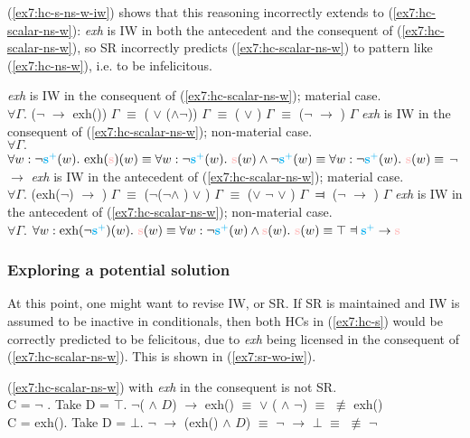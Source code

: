 (\ref{ex7:hc-s-ns-w-iw}) shows that this reasoning incorrectly extends to (\ref{ex7:hc-scalar-ns-w}): \textit{exh} is IW in both the antecedent and the consequent of (\ref{ex7:hc-scalar-ns-w}), so SR incorrectly predicts (\ref{ex7:hc-scalar-ns-w}) to pattern like (\ref{ex7:hc-ns-w}), i.e. to be infelicitous.

\begin{exe}
	\ex\label{ex7:hc-s-ns-w-iw}
	\begin{xlist}
		\ex\textit{exh} is IW in the consequent of (\ref{ex7:hc-scalar-ns-w}); material case.\\ $\forall \Gamma.$ ($\neg$\splus{} $\rightarrow$ exh(\s)) $\Gamma$ $\equiv$ (\splus{} $\vee$ (\s$\wedge$$\neg$\splus)) $\Gamma$ $\equiv$ (\splus{} $\vee$ \s) $\Gamma$ $\equiv$ ($\neg$\splus{} $\rightarrow$ \s) $\Gamma$
		\ex\textit{exh} is IW in the consequent of (\ref{ex7:hc-scalar-ns-w}); non-material case.\\ $\forall \Gamma.$ $\forall w: \neg\splus(w). \ \text{exh}(\s)(w) \equiv \forall w: \neg\splus(w). \ \s(w) \wedge \neg \splus(w) \equiv \forall w: \neg\splus(w). \ \s(w) \equiv$ $\neg$\splus $\rightarrow$ \s
		\ex\textit{exh} is IW in the antecedent of (\ref{ex7:hc-scalar-ns-w}); material case.\\
		$\forall \Gamma.$ (exh($\neg$\splus) $\rightarrow$ \s{}) $\Gamma$ $\equiv$ ($\neg$($\neg$\splus $\wedge$ \s) $\vee$ \s{}) $\Gamma$ $\equiv$ (\splus $\vee$ $\neg$\s{} $\vee$ \s) $\Gamma$ $\Dashv$ ($\neg$\splus{} $\rightarrow$ \s) $\Gamma$
		\ex\textit{exh} is IW in the antecedent of (\ref{ex7:hc-scalar-ns-w}); non-material case.\\$\forall \Gamma.$ $\forall w: \text{exh}(\neg\splus)(w). \ \s(w) \equiv \forall w: \neg\splus(w) \wedge \s(w). \ \s(w) \equiv \top \Dashv \splus \rightarrow \s$
	\end{xlist}
\end{exe}

\subsubsection{Exploring a potential solution}\label{sec:sr-iw-tentative-solution}
At this point, one might want to revise IW, or SR. If SR is maintained and IW is assumed to be inactive in conditionals, then both HCs in (\ref{ex7:hc-s}) would be correctly predicted to be felicitous, due to \textit{exh} being licensed in the consequent of (\ref{ex7:hc-scalar-ns-w}). This is shown in (\ref{ex7:sr-wo-iw}).

\begin{exe}
	\ex\label{ex7:sr-wo-iw} {(\ref{ex7:hc-scalar-ns-w}) with \textit{exh} in the consequent is not SR.\\
		C = $\neg$ \splus. Take D = $\top$. $\neg$(\splus{} $\wedge$ $D$) $\rightarrow$ exh(\s) $\equiv$ \splus{} $\vee$ (\s{} $\wedge$ $\neg$\splus) $\equiv$ \s{} $\not\equiv$ exh(\s)\\
		C = exh(\s). Take D = $\bot$. $\neg$\splus{} $\rightarrow$ (exh(\s) $\wedge$ $D$) $\equiv$ $\neg$\splus{} $\rightarrow$ $\bot$ $\equiv$ \splus{} $\not\equiv$ $\neg$\splus}
\end{exe}

